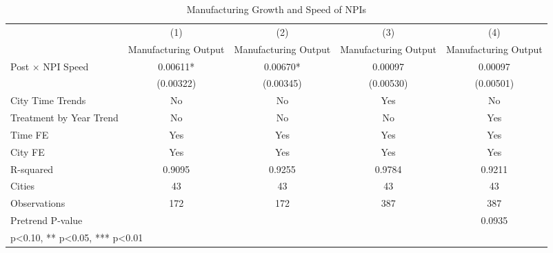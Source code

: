 \begin{table}[htbp]\centering
\def\sym#1{\ifmmode^{#1}\else\(^{#1}\)\fi}
\caption{Manufacturing Growth and Speed of NPIs}
\begin{tabular}{l*{4}{c}}
\hline\hline
                    &\multicolumn{1}{c}{(1)}   &\multicolumn{1}{c}{(2)}   &\multicolumn{1}{c}{(3)}   &\multicolumn{1}{c}{(4)}   \\
                    &Manufacturing Output   &Manufacturing Output   &Manufacturing Output   &Manufacturing Output   \\
\hline
Post $\times$ NPI Speed&     0.00611*  &     0.00670*  &     0.00097   &     0.00097   \\
                    &   (0.00322)   &   (0.00345)   &   (0.00530)   &   (0.00501)   \\
City Time Trends    &          No   &          No   &         Yes   &          No   \\
Treatment by Year Trend &          No   &          No   &          No   &         Yes   \\
Time FE             &         Yes   &         Yes   &         Yes   &         Yes   \\
\hline
City FE             &         Yes   &         Yes   &         Yes   &         Yes   \\
R-squared           &      0.9095   &      0.9255   &      0.9784   &      0.9211   \\
Cities              &          43   &          43   &          43   &          43   \\
Observations        &         172   &         172   &         387   &         387   \\
Pretrend P-value    &               &               &               &      0.0935   \\
\hline\hline
\multicolumn{5}{l}{\footnotesize * p<0.10, ** p<0.05, *** p<0.01}\\
\end{tabular}
\end{table}
